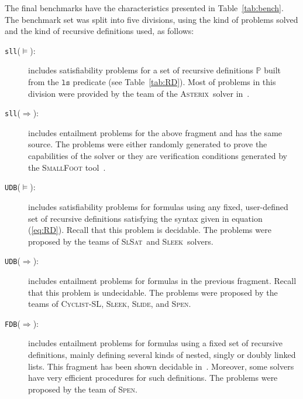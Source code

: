 \documentclass{llncs}
\newcommand{\limp}{\Rightarrow}
\newcommand{\preds}{\mathbb{P}}
\newcommand{\ls}{\mathtt{ls}}
\newcommand{\sllsat}{\texttt{sll}($\models$)}
\newcommand{\sllent}{\texttt{sll}($\limp$)}
\newcommand{\FDBent}{\texttt{FDB}($\limp$)}
\newcommand{\UDBsat}{\texttt{UDB}($\models$)}
\newcommand{\UDBent}{\texttt{UDB}($\limp$)}
\newcommand{\ASTERIX}{\textsc{Asterix}}
\newcommand{\CYCLIST}{\textsc{Cyclist-SL}}
\newcommand{\SLEEK}{\textsc{Sleek}}
\newcommand{\SLIDE}{\textsc{Slide}}
\newcommand{\SLSAT}{\textsc{SlSat}}
\newcommand{\SPEN}{\textsc{Spen}}
\begin{document}
The final benchmarks have the characteristics presented in Table~\ref{tab:bench}.
The benchmark set was split into five divisions, using the kind of problems solved and the kind of recursive definitions used, as follows:
\begin{description}
\item[\sllsat:] includes satisfiability problems for a set of recursive definitions $\preds$ built from the $\ls$ predicate (see Table~\ref{tab:RD}).
Most of problems in this division were provided by the team of the \ASTERIX\ solver in~\cite{PerezR11}.

\item[\sllent:] includes entailment problems for the above fragment and has the same source. The problems were either randomly generated to prove the capabilities of the solver or they are verification conditions generated by the \textsc{SmallFoot} tool~\cite{SmallFootsite}.

\item[\UDBsat:] includes satisfiability problems for formulas using any fixed, user-defined set of recursive definitions satisfying the syntax given in equation (\ref{eq:RD}).
Recall that this problem is decidable. 
The problems were proposed by the teams of \SLSAT\ and \SLEEK\ solvers.

\item[\UDBent:] includes entailment problems for formulas in the previous fragment.
Recall that this problem is undecidable. 
The problems were proposed by the teams of \CYCLIST, \SLEEK, \SLIDE, and \SPEN.

\item[\FDBent:] includes entailment problems for formulas using a fixed set of recursive definitions, mainly defining several kinds of nested, singly or doubly linked lists. This fragment has been shown decidable in~\cite{AntonopoulosGHKO14,EneaLSV14}.
Moreover, some solvers have very efficient procedures for such definitions.
The problems were proposed by the team of \SPEN.
\end{description} 
 
\end{document}
